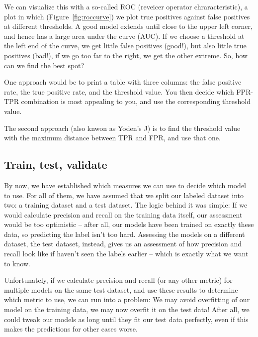 We can visualize this with a so-called ROC (reveicer operator
chraracteristic), a plot in which (Figure~\ref{fig:roccurve}) we plot
true positives against false positives at different thresholds.  A
good model extends until close to the upper left corner, and hence has
a large area under the curve (AUC).  If we choose a threshold at the
left end of the curve, we get little false positives (good!), but also
little true positives (bad!), if we go too far to the right, we get
the other extreme. So, how can we find the best spot?

One approach would be to print a table with three columns: the false
positive rate, the true positive rate, and the threshold value. You
then decide which FPR-TPR combination is most appealing to you, and
use the corresponding threshold value.

The second approach (also knwon as Yoden's J) is to find the threshold
value with the maximum distance between TPR and FPR, and use that one.




\subsection{Train, test, validate}
By now, we have established which measures we can use to decide which
model to use. For all of them, we have assumed that we split our
labeled dataset into two: a training dataset and a test dataset. The
logic behind it was simple: If we would calculate precision and recall
on the training data itself, our assessment would be too optimistic --
after all, our models have been trained on exactly these data, so
predicting the label isn't too hard. Assessing the models on a different
dataset, the test dataset, instead, gives us an assessment of how
precision and recall look like if haven't seen the labels earlier --
which is exactly what we want to know.

Unfortunately, if we calculate precision and recall (or any other
metric) for multiple models on the same test dataset, and use these
results to determine which metric to use, we can run into a problem:
We may avoid overfitting of our model on the training data, we may now
overfit it on the test data! After all, we could tweak our models as
long until they fit our test data perfectly, even if this makes the
predictions for other cases worse.

